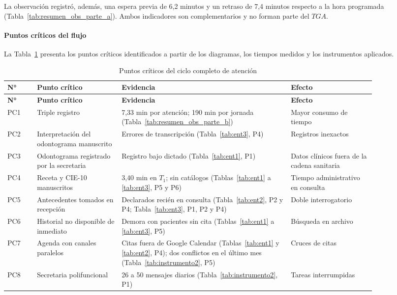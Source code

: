 La observación registró, además, una espera previa de 6,2 minutos y un retraso de 7,4 minutos respecto a la hora programada (Tabla~\ref{tab:resumen_obs_parte_a}). Ambos indicadores son complementarios y no forman parte del $TGA$.

\paragraph{Puntos críticos del flujo}

La Tabla~\ref{tab:puntos_criticos} presenta los puntos críticos identificados a partir de los diagramas, los tiempos medidos y los instrumentos aplicados.

\begingroup
\fontsize{9}{11}\selectfont
\renewcommand{\arraystretch}{1.2}
\setlength{\LTpre}{0pt}\setlength{\LTpost}{6pt}
\setlength{\tabcolsep}{4pt}
\begin{longtable}{|>{\centering\arraybackslash}p{0.07\linewidth}|p{0.20\linewidth}|p{0.40\linewidth}|p{0.20\linewidth}|}
\caption{Puntos críticos del ciclo completo de atención}
\label{tab:puntos_criticos} \\
\hline
\textbf{N°} & \textbf{Punto crítico} & \textbf{Evidencia} & \textbf{Efecto} \\ \hline
\endfirsthead
\hline
\textbf{N°} & \textbf{Punto crítico} & \textbf{Evidencia} & \textbf{Efecto} \\ \hline
\endhead
PC1 & Triple registro & 7,33 min por atención; 190 min por jornada (Tabla~\ref{tab:resumen_obs_parte_b}) & Mayor consumo de tiempo \\ \hline
PC2 & Interpretación del odontograma manuscrito & Errores de transcripción (Tabla~\ref{tab:ent3}, P4) & Registros inexactos \\ \hline
PC3 & Odontograma registrado por la secretaria & Registro bajo dictado (Tabla~\ref{tab:ent1}, P1) & Datos clínicos fuera de la cadena sanitaria \\ \hline
PC4 & Receta y CIE-10 manuscritos & 3,40 min en $T_1$; sin catálogos (Tablas~\ref{tab:ent1} a \ref{tab:ent3}, P5 y P6) & Tiempo administrativo en consulta \\ \hline
PC5 & Antecedentes tomados en recepción & Declarados recién en consulta (Tabla~\ref{tab:ent2}, P2 y P4; Tabla~\ref{tab:ent3}, P1, P2 y P4) & Doble interrogatorio \\ \hline
PC6 & Historial no disponible de inmediato & Demora con pacientes sin cita (Tablas~\ref{tab:ent1} a \ref{tab:ent3}, P5) & Búsqueda en archivo \\ \hline
PC7 & Agenda con canales paralelos & Citas fuera de Google Calendar (Tablas~\ref{tab:ent1} y \ref{tab:ent2}, P4); dos conflictos en el último mes (Tabla~\ref{tab:instrumento2}, P5) & Cruces de citas \\ \hline
PC8 & Secretaria polifuncional & 26 a 50 mensajes diarios (Tabla~\ref{tab:instrumento2}, P1) & Tareas interrumpidas \\ \hline
\end{longtable}
\endgroup

